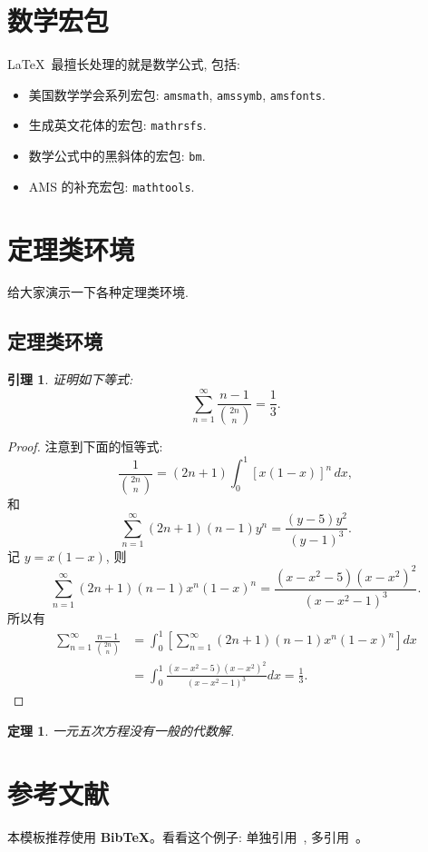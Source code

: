 \documentclass{article}
\newtheorem{lemma}{引理}
\newtheorem{theorem}{定理}
\begin{document}
\section{数学宏包}
\LaTeX\ 最擅长处理的就是数学公式, 包括:
\begin{itemize}
\item 美国数学学会系列宏包: \texttt{amsmath}, \texttt{amssymb}, \texttt{amsfonts}.
\item 生成英文花体的宏包: \texttt{mathrsfs}.
\item 数学公式中的黑斜体的宏包: \texttt{bm}.
\item AMS 的补充宏包: \texttt{mathtools}.
\end{itemize}

\section{定理类环境}
给大家演示一下各种定理类环境.

\subsection{定理类环境}

\begin{lemma}
证明如下等式:
\[
\sum_{n=1}^{\infty}\frac{n-1}{\binom{2n}{n}}=\frac{1}{3}.
\]
\end{lemma}

\begin{proof}
注意到下面的恒等式:
\[
\frac{1}{\binom{2n}{n}}=(2n+1)\int_0^1[x(1-x)]^n\,dx,
\]
和
\[
\sum_{n=1}^{\infty}(2n+1)(n-1)y^n=\frac{(y-5)y^2}{(y-1)^3}.
\]
记 $y=x(1-x)$, 则
\[
\sum_{n=1}^{\infty}(2n+1)(n-1)x^n(1-x)^n=\frac{(x-x^2-5)(x-x^2)^2}{(x-x^2-1)^3}.
\]
所以有
\begin{align*}
\sum_{n=1}^{\infty}\frac{n-1}{\binom{2n}{n}} & =
\int_0^1\left[\sum_{n=1}^{\infty}(2n+1)(n-1)x^n(1-x)^n\right]dx\\
& =\int_0^1\frac{(x-x^2-5)(x-x^2)^2}{(x-x^2-1)^3}dx=\frac13.
\end{align*}
\end{proof}

\begin{theorem}\label{the:theorem1}
一元五次方程没有一般的代数解.
\end{theorem}
\section{参考文献}
本模板推荐使用 \textbf{BibTeX}。看看这个例子: 单独引用~\cite{Li_2024_CVPR}, 多引用~\cite{Li_2024_CVPR,Peng_2024_CVPR,Xu_2024_CVPR,Yang_2024_CVPR}。

\newpage
{}


\end{document}
